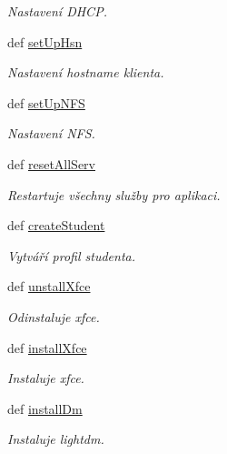 \begin{DoxyCompactItemize}
\begin{DoxyCompactList}\small\item\em Nastavení D\-H\-C\-P. \end{DoxyCompactList}\item 
def \hyperlink{classConfSys_1_1ConfSys_a361378fc045e56711c9bde9874fc06bf}{set\-Up\-Hsn}
\begin{DoxyCompactList}\small\item\em Nastavení hostname klienta. \end{DoxyCompactList}\item 
def \hyperlink{classConfSys_1_1ConfSys_a787b4f7c745fb7523086a6a97a79eecf}{set\-Up\-N\-F\-S}
\begin{DoxyCompactList}\small\item\em Nastavení N\-F\-S. \end{DoxyCompactList}\item 
def \hyperlink{classConfSys_1_1ConfSys_a75def3f5e902bb94b3704db721d8b573}{reset\-All\-Serv}
\begin{DoxyCompactList}\small\item\em Restartuje všechny služby pro aplikaci. \end{DoxyCompactList}\item 
def \hyperlink{classConfSys_1_1ConfSys_a086abe49a00bb5d105cc7f8b8a4db49e}{create\-Student}
\begin{DoxyCompactList}\small\item\em Vytváří profil studenta. \end{DoxyCompactList}\item 
def \hyperlink{classConfSys_1_1ConfSys_a0992f277e8ca9e28938ca2b2dde59ea1}{unstall\-Xfce}
\begin{DoxyCompactList}\small\item\em Odinstaluje xfce. \end{DoxyCompactList}\item 
def \hyperlink{classConfSys_1_1ConfSys_a3b5dad79e382f77b71218611bb97a25b}{install\-Xfce}
\begin{DoxyCompactList}\small\item\em Instaluje xfce. \end{DoxyCompactList}\item 
def \hyperlink{classConfSys_1_1ConfSys_acc9747fb9c27ec9b502f05f8e9038e93}{install\-Dm}
\begin{DoxyCompactList}\small\item\em Instaluje lightdm. \end{DoxyCompactList}\item 

\end{DoxyCompactItemize}
